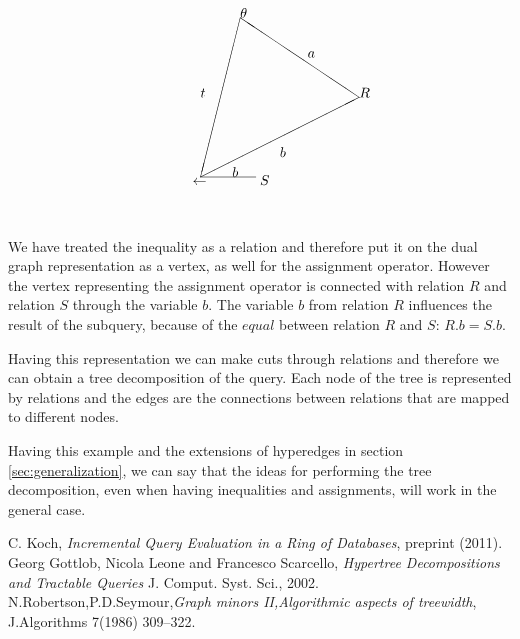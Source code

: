 \documentclass[12pt]{article}
\begin{document}
\begin{align}
\label{hyper3}
\setlength{\unitlength}{1mm}
\begin{picture}(50,50)
\put(50,30){\line(-3,2){30}}
\put(20,50){\line(-1,-4){10}}
\put(10,10){\line(2,1){40}}
\put(10,10){\line(5,0){14}}
\put(50,30){$R$}
\put(20,50){$\theta$}
\put(8,8){$\gets$}
\put(25,8){$S$}
\put(30,15){$b$}
\put(37,40){$a$}
\put(10,30){$t$}
\put(18,10){$b$}
\end{picture}
\end{align}

We have treated the inequality as a relation and therefore put it on the dual graph representation as a vertex, as well for the assignment operator. However the vertex representing the assignment operator is connected with relation $R$ and relation $S$ through the variable $b$. The variable $b$ from relation $R$ influences the result of the subquery, because of the $equal$ between relation $R$ and $S$: $R.b=S.b$.

Having this representation we can make cuts through relations and therefore we can obtain a tree decomposition of the query. Each node of the tree is represented by relations and the edges are the connections between relations that are mapped to different nodes.

Having this example and the extensions of hyperedges in section \ref{sec:generalization}, we can say that the ideas for performing the tree decomposition, even when having inequalities and assignments, will work in the general case. 

\begin{thebibliography}{9}
 C. Koch, \emph{Incremental Query Evaluation in a Ring of Databases},  preprint (2011).
 Georg Gottlob, Nicola Leone and Francesco Scarcello, \emph{Hypertree Decompositions and Tractable Queries} J. Comput. Syst. Sci., 2002.
N.Robertson,P.D.Seymour,\emph{Graph minors II,Algorithmic aspects of treewidth}, J.Algorithms 7(1986) 309–322.
\end{thebibliography}
\end{document}
